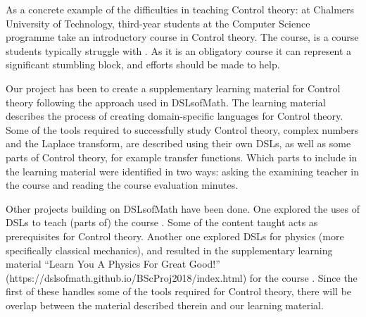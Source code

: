 As a concrete example of the difficulties in teaching Control theory: at Chalmers University of Technology, third-year students at the Computer Science programme take an introductory course in Control theory. The course,  is a course students typically struggle with \cite[p.~85]{Jansson_2019}. As it is an obligatory course it can represent a significant stumbling block, and efforts should be made to help. 

Our project has been to create a supplementary learning material for Control theory following the approach used in DSLsofMath. The learning material describes the process of creating domain-specific languages for Control theory. Some of the tools required to successfully study Control theory, complex numbers and the Laplace transform, are described using their own DSLs, as well as some parts of Control theory, for example transfer functions. Which parts to include in the learning material were identified in two ways: asking the examining teacher in the course and reading the course evaluation minutes. 

Other projects building on DSLsofMath have been done. One \cite{tssarbete} explored the uses of DSLs to teach (parts of) the course . Some of the content taught acts as prerequisites for Control theory. Another one \cite{fysikarbete} explored DSLs for physics (more specifically classical mechanics), and resulted in the supplementary learning material ``Learn You A Physics For Great Good!'' (https://dslsofmath.github.io/BScProj2018/index.html) for the course .
Since the first of these handles some of the tools required for Control theory, there will be overlap between the material described therein and our learning material. 



